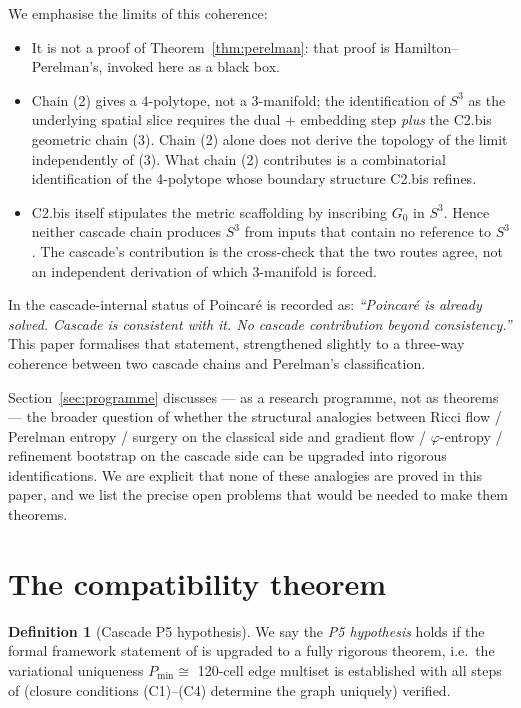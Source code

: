 \documentclass[11pt, a4paper]{amsart}
\theoremstyle{definition}
\newtheorem{definition}[theorem]{Definition}
\begin{document}
We emphasise the limits of this coherence:
\begin{itemize}
\item It is not a proof of Theorem~\ref{thm:perelman}: that proof
  is Hamilton--Perelman's, invoked here as a black box.
\item Chain (2) gives a $4$-polytope, not a $3$-manifold; the
  identification of $S^{3}$ as the underlying spatial slice
  requires the dual + embedding step \emph{plus} the C2.bis
  geometric chain (3). Chain (2) alone does not derive the
  topology of the limit independently of (3). What chain (2)
  contributes is a combinatorial identification of the
  4-polytope whose boundary structure C2.bis refines.
\item C2.bis itself stipulates the metric scaffolding by inscribing
  $G_{0}$ in $S^{3}$. Hence neither cascade chain produces $S^{3}$
  from inputs that contain no reference to $S^{3}$. The cascade's
  contribution is the cross-check that the two routes agree, not
  an independent derivation of which $3$-manifold is forced.
\end{itemize}

In \cite[\S MP6.3]{CascadeMillennium} the cascade-internal status
of Poincar\'{e} is recorded as: \emph{``Poincar\'{e} is already
solved. Cascade is consistent with it. No cascade contribution
beyond consistency.''} This paper formalises that statement,
strengthened slightly to a three-way coherence between two cascade
chains and Perelman's classification.

Section~\ref{sec:programme} discusses --- as a research programme,
not as theorems --- the broader question of whether the structural
analogies between Ricci flow / Perelman entropy / surgery on the
classical side and gradient flow / $\varphi$-entropy / refinement
bootstrap on the cascade side can be upgraded into rigorous
identifications. We are explicit that none of these analogies are
proved in this paper, and we list the precise open problems that
would be needed to make them theorems.

\section{The compatibility theorem}
\label{sec:compatibility}

\begin{definition}[Cascade P5 hypothesis]
\label{def:p5-hyp}
We say the \emph{P5 hypothesis} holds if the formal framework
statement of \cite[\S P5.1]{CascadePregeometry} is upgraded to a
fully rigorous theorem, i.e.\ the variational uniqueness
$P_{\min} \cong $ 120-cell edge multiset is established with all
steps of \cite[\S P5.2]{CascadePregeometry} (closure conditions
(C1)--(C4) determine the graph uniquely) verified.
\end{definition}
\end{document}

